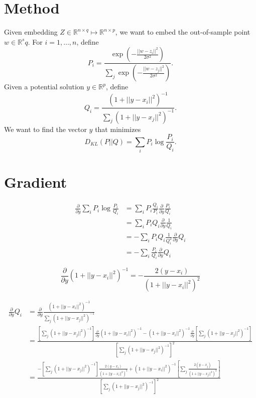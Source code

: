 \documentclass{article}
\newcommand{\partialy}{{\frac{\partial}{\partial y}}}
\begin{document}
\section{Method}
Given embedding $Z \in \mathbb{R}^{n \times q} \mapsto \mathbb{R}^{n \times p}$, we want to embed the out-of-sample point $w \in \mathbb{R}^sq$. For $i = 1,\hdots,n$, define $$P_i = \frac{\exp \left( -\frac{||w-z_i||^2}{2\sigma^2} \right)}{\sum_j \exp \left( -\frac{||w-z_j||^2}{2\sigma^2} \right)}.$$ Given a potential solution $y \in \mathbb{R}^p$, define $$Q_i = \frac{(1 + ||y-x_i||^2)^{-1}}{\sum_j (1+||y-x_j||^2)^{-1}}.$$ We want to find the vector $y$ that minimizes $$D_{KL}(P || Q) = \sum_i P_i \log \frac{P_i}{Q_i}.$$

\section{Gradient}
\begin{equation*}
\begin{split}
\partialy \sum_i P_i \log \frac{P_i}{Q_i} &= \sum_i P_i \frac{Q_i}{P_i} \partialy \frac{P_i}{Q_i} \\
&= \sum_i P_iQ_i \partialy \frac{1}{Q_i} \\
&= -\sum_i P_iQ_i \frac{1}{Q_i^2} \partialy Q_i\\
&= -\sum_i \frac{P_i}{Q_i} \partialy Q_i
\end{split}
\end{equation*}

$$\partialy (1 + ||y-x_i||^2)^{-1} = -\frac{2(y-x_i)}{(1 + ||y-x_i||^2)^2}$$

\begin{equation*}
\begin{split}
\partialy Q_i &= \partialy \frac{(1 + ||y-x_i||^2)^{-1}}{\sum_j (1+||y-x_j||^2)^{-1}} \\
&= \frac{\left[ \sum_j (1+||y-x_j||^2)^{-1} \right] \partialy (1 + ||y-x_i||^2)^{-1} - (1 + ||y-x_i||^2)^{-1} \partialy \left[ \sum_j (1+||y-x_j||^2)^{-1} \right]}{\left[ \sum_j (1+||y-x_j||^2)^{-1} \right]^2} \\
&= \frac{-\left[ \sum_j (1+||y-x_j||^2)^{-1} \right] \frac{2(y-x_i)}{(1 + ||y-x_i||^2)^2} + (1 + ||y-x_i||^2)^{-1} \left[ \sum_j \frac{2(y-x_j)}{(1 + ||y-x_j||^2)^2} \right]}{\left[ \sum_j (1+||y-x_j||^2)^{-1} \right]^2} \\
\end{split}
\end{equation*}
\end{document}
